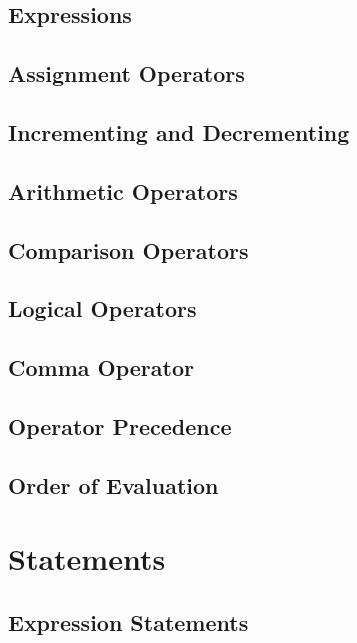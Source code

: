 \documentclass{article}
\begin{document}
\subsection{Expressions}

\subsection{Assignment Operators}

\subsection{Incrementing and Decrementing}

\subsection{Arithmetic Operators}

\subsection{Comparison Operators}

\subsection{Logical Operators}

\subsection{Comma Operator}

\subsection{Operator Precedence}

\subsection{Order of Evaluation}

\section{Statements}

\subsection{Expression Statements}
\end{document}
